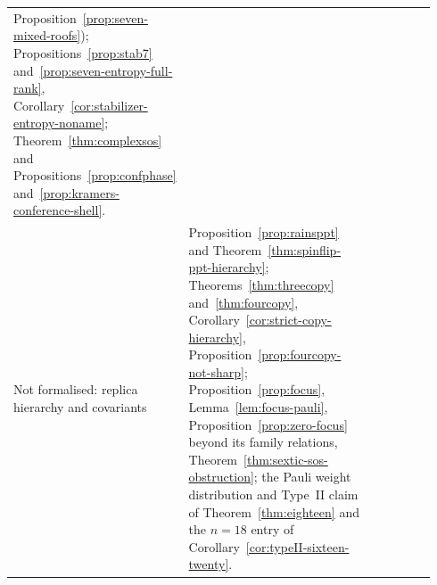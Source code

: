 {\begin{longtable}{@{}>{\raggedright\arraybackslash}p{0.14\linewidth}>{\raggedright\arraybackslash}p{0.49\linewidth}>{\raggedright\arraybackslash}p{0.31\linewidth}@{}}
Proposition~\ref{prop:seven-mixed-roofs}); Propositions~\ref{prop:stab7} and~\ref{prop:seven-entropy-full-rank},
Corollary~\ref{cor:stabilizer-entropy-noname}; Theorem~\ref{thm:complexsos} and Propositions~\ref{prop:confphase}
and~\ref{prop:kramers-conference-shell}. & \\
Not formalised: replica hierarchy and covariants &
Proposition~\ref{prop:rainsppt} and Theorem~\ref{thm:spinflip-ppt-hierarchy}; Theorems~\ref{thm:threecopy} and~\ref{thm:fourcopy},
Corollary~\ref{cor:strict-copy-hierarchy}, Proposition~\ref{prop:fourcopy-not-sharp}; Proposition~\ref{prop:focus},
Lemma~\ref{lem:focus-pauli}, Proposition~\ref{prop:zero-focus} beyond its family relations, Theorem~\ref{thm:sextic-sos-obstruction};
the Pauli weight distribution and Type~II claim of Theorem~\ref{thm:eighteen} and the $n=18$ entry of
Corollary~\ref{cor:typeII-sixteen-twenty}. & \\
\bottomrule
\end{longtable}
}
